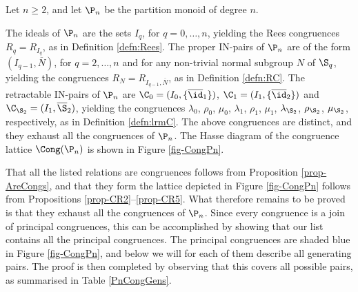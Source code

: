 
\begin{thm}\label{thm-CongPn}
Let $n\geq2$, and let $\P_n$ be the partition monoid of degree $n$.  
\begin{itemize}
 The ideals of $\P_n$ are the sets $I_q$, for $q=0,\ldots,n$, yielding the Rees congruences $R_q=R_{I_q}$, as in Definition \ref{defn:Rees}.
 The proper IN-pairs of $\P_n$ are of the form $(I_{q-1},\overline N)$, for $q=2,\ldots,n$ and for any non-trivial normal subgroup $N$ of $\S_q$, yielding the congruences $R_N=R_{I_{q-1},\overline N}$, as in Definition \ref{defn:RC}.
 The retractable IN-pairs of $\P_n$ are $\C_0=(I_0,\{\overline{\id}_1\})$, $\C_1=(I_1,\{\overline{\id}_2\})$ and $\C_{\S_2}=(I_1,\overline{\S}_2)$, yielding the congruences $\lambda_0$, $\rho_0$, $\mu_0$, $\lambda_1$, $\rho_1$, $\mu_1$, $\lambda_{\S_2}$, $\rho_{\S_2}$, $\mu_{\S_2}$, respectively, as in Definition \ref{defn:lrmC}.
 The above congruences are distinct, and they exhaust all the congruences of $\P_n$.
 The Hasse diagram of the congruence lattice $\Cong(\P_n) $ is shown in Figure \ref{fig-CongPn}.
\end{itemize}
\end{thm}


\pf
That all the listed relations are congruences follows from Proposition \ref{prop-AreCongs}, and that they form the lattice depicted in Figure \ref{fig-CongPn} follows from Propositions \ref{prop-CR2}--\ref{prop-CR5}.
What therefore remains to be proved is that they exhaust all the congruences of $\P_n$.
Since every congruence is a join of principal congruences, this can be accomplished by showing that our list contains all the principal congruences. 
The principal congruences are shaded blue in Figure \ref{fig-CongPn}, and below we will for each of them describe all generating pairs. 
The proof is then completed by observing that this covers all possible pairs, as summarised in Table \ref{PnCongGens}.
\epf



